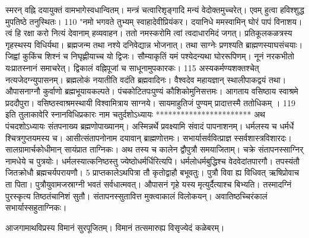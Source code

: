 स्मरन् वह्नि दयायुक्तं वामभागेस्वधान्वितम्।
 मन्त्रं चत्वारिशृङ्गादि मन्यं वेदोक्तमुच्चरेत्।
 एवम् हुत्वा हविश्शुद्ध मुपतिष्ठे तनुस्थितः।
 110 "नमो भगवते तुभ्यम् स्वाहादेवीप्रियंकर।
 दयानिधे ममस्वामिन् घोरं पापं विनाशय।
 त्वं हि रक्षा करो नित्यं देवानाम् हव्यवाहन।
 ततो नमस्करोमि त्वां त्वदाधारमिदं जगत्।
 प्रतिकूलकळत्रस्य गृहस्थस्य विधिर्यथा।
 ब्रह्मजन्म तथा नश्ये दनिवेद्यान्न भोजनात्।
 तथा साग्नेः प्रणश्यति ब्राह्मणस्याघसंचयाः।
 जिह्वां कुकिंच शिश्नं च निघृह्णीयाच्च यो द्विजः।
 सौम्याकृतिं यमं पश्येदन्यथा घोररूपिणम्।
 नूनं नरकभीतो यःप्रातस्नानं समाचरेत्।
 द्विकालं वह्निपूजां च साधूनामुपकारकः।
 115 अस्यकर्मण्यशक्तश्चेत् नत्यजेदग्न्युपासनम्।
 ब्रह्मलोकं नयातीति वदंति ब्रह्मवादिनः।
 वैश्वदेव महायज्ञान् स्थालीपाकद्वयं तथा।
 औपासनाग्नौ कुर्वाणो ब्रह्मभूयायकल्पते।
 पंचकोटितपःपुण्यं कौशिकोमुनिसत्तमः।
 आगताय वसिष्ठाय स्वाश्रमे प्रददौपुरा।
 वसिष्ठस्वाश्रमस्थायी विश्वामित्राय साग्नये।
 सायमाहुतिजं पुण्यम् प्रादात्तस्मै ततोधिकम् ।
 119
इति तुलाकावेरि स्नानविधिप्रकारः नाम
चतुर्दशोऽध्यायः
***********************
अथ पंचदशोऽध्यायः
संतपनाख्य ब्रह्मणोपाख्यानम्।
 अस्मिन्नर्थे प्रवक्ष्यामि संवादं पापनाशनम्।
 धर्मलस्य च धर्मर्धे श्चित्रगुप्तयमस्य च।
 आसीत्संतापनोनाम दयावान् ब्राह्मणोत्तमः।
 सभार्यासर्ववित्प्राज्ञ स्सर्वशास्त्रविशारदः।
 सालग्रामार्चकोधीमान् सायंप्रात ताग्निकः।
 अथ तस्य च कालेन द्वौपुत्रौ समयाजिताम्।
 चक्रे संतापनस्साग्निर् नामधेये च पुत्रयोः।
 धर्मलस्यात्कनिष्ठस्तु ज्येष्ठोधर्मर्धिरित्यपि।
 धर्मलोधर्मबुद्धिश्च वेदवेदांतपारगौ।
 तपस्यंतौ जितक्रोधौ ब्रह्मचर्यपरायणौ।
 5 प्राप्तकालेऽथपित्रा तौ कृतोद्वाहौ बभूवतुः।
 पुत्रौ विवा ह्य विधिवत् ऋषिप्रोवाच ता पिता।
 पुत्रौयुवामजस्राग्नी भवतं सर्वधात्मवत्।
 औपासनं गृहे यस्य मृत्युर्दैत्याश्च बिभ्यति।
 तस्मादग्निं पुरस्कृत्य तिष्ठतंचानिशं सुतौ।
 संतापनस्सुतावित्त मुक्त्वाकालं विलोकयन्।
 अवातिष्ठच्चिरंकालं सभार्यास्सहुताग्निकः।
 
आजगामाथविप्रस्य विमानं सुरपूजितम्।
 विमानं तत्समारुह्य विसृज्येदं कळेबरम्।
 
